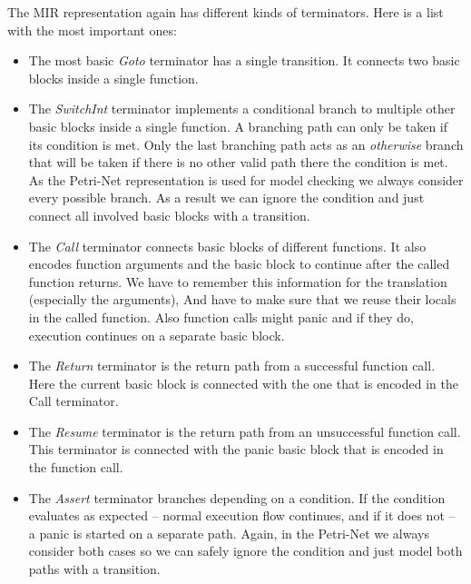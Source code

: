 The MIR representation again has different kinds of terminators. Here is a list with the most important ones:
\begin{itemize}
    \item The most basic \textit{Goto} terminator has a single transition.
    It connects two basic blocks inside a single function.
    \item The \textit{SwitchInt} terminator implements a conditional branch to multiple other basic blocks inside a single function.
    A branching path can only be taken if its condition is met.
    Only the last branching path acts as an \textit{otherwise} branch that will be taken if there is no other valid path there the condition is met.
    As the Petri-Net representation is used for model checking we always consider every possible branch.
    As a result we can ignore the condition and just connect all involved basic blocks with a transition.
    \item The \textit{Call} terminator connects basic blocks of different functions.
    It also encodes function arguments and the basic block to continue after the called function returns.
    We have to remember this information for the translation (especially the arguments),
    And have to make sure that we reuse their locals in the called function.
    Also function calls might panic and if they do, execution continues on a separate basic block.
    \item The \textit{Return} terminator is the return path from a successful function call.
    Here the current basic block is connected with the one that is encoded in the Call terminator.
    \item The \textit{Resume} terminator is the return path from an unsuccessful function call.
    This terminator is connected with the panic basic block that is encoded in the function call.
    \item The \textit{Assert} terminator branches depending on a condition.
    If the condition evaluates as expected -- normal execution flow continues, and if it does not -- a panic is started on a separate path.
    Again, in the Petri-Net we always consider both cases so we can safely ignore the condition and just model both paths with a transition.
\end{itemize}

